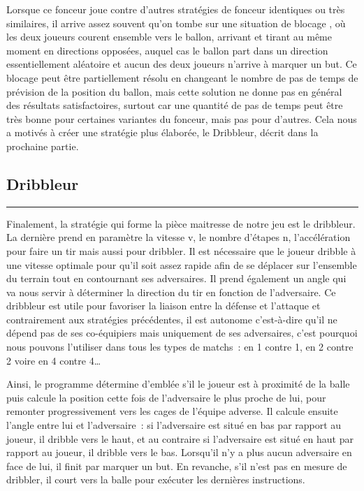 \documentclass[a4paper,12pt]{article}
\numberwithin{equation}{section}
\begin{document}
Lorsque ce fonceur joue contre d'autres stratégies de fonceur identiques ou très similaires, il arrive assez souvent qu'on tombe sur une situation de \og blocage \fg, où les deux joueurs courent ensemble vers le ballon, arrivant et tirant au même moment en directions opposées, auquel cas le ballon part dans un direction essentiellement aléatoire et aucun des deux joueurs n'arrive à marquer un but. Ce blocage peut être partiellement résolu en changeant le nombre de pas de temps de prévision de la position du ballon, mais cette solution ne donne pas en général des résultats satisfactoires, surtout car une quantité de pas de temps peut être très bonne pour certaines variantes du fonceur, mais pas pour d'autres. Cela nous a motivés à créer une stratégie plus élaborée, le Dribbleur, décrit dans la prochaine partie.

\subsection{Dribbleur}

\noindent \textcolor{red}{\rule{\textwidth}{0.5cm}}

Finalement, la stratégie qui forme la pièce maitresse de notre jeu est le dribbleur. La dernière prend en paramètre la vitesse v, le nombre d’étapes n, l’accélération pour faire un tir mais aussi pour dribbler. Il est nécessaire que le joueur dribble à une vitesse optimale pour qu’il soit assez rapide afin de se déplacer sur l’ensemble du terrain tout en contournant ses adversaires. Il prend également un angle qui va nous servir à déterminer la direction du tir en fonction de l’adversaire. Ce dribbleur est utile pour favoriser la liaison entre la défense et l’attaque et contrairement aux stratégies précédentes, il est autonome c’est-à-dire qu’il ne dépend pas de ses co-équipiers mais uniquement de ses adversaires, c’est pourquoi nous pouvons l’utiliser dans tous les types de matchs : en 1 contre 1, en 2 contre 2 voire en 4 contre 4…
	
Ainsi, le programme détermine d’emblée s’il le joueur est à proximité de la balle puis calcule la position cette fois de l’adversaire le plus proche de lui, pour remonter progressivement vers les cages de l’équipe adverse. Il calcule ensuite l’angle entre lui et l’adversaire : si l’adversaire est situé en bas par rapport au joueur, il dribble vers le haut, et au contraire si l’adversaire est situé en haut par rapport au joueur, il dribble vers le bas. Lorsqu’il n’y a plus aucun adversaire en face de lui, il finit par marquer un but. En revanche, s’il n’est pas en mesure de dribbler, il court vers la balle pour exécuter les dernières instructions.
\end{document}
